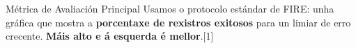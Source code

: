 \documentclass[xcolor=dvipsnames]{beamer}
\begin{document}
\begin{frame}
    \begin{alertblock}{Métrica de Avaliación Principal}
        Usamos o protocolo estándar de FIRE: unha gráfica que mostra a \textbf{porcentaxe de rexistros exitosos} para un limiar de erro crecente. \textbf{Máis alto e á esquerda é mellor}.[1]
    \end{alertblock}
    
\end{frame}
\end{document}
